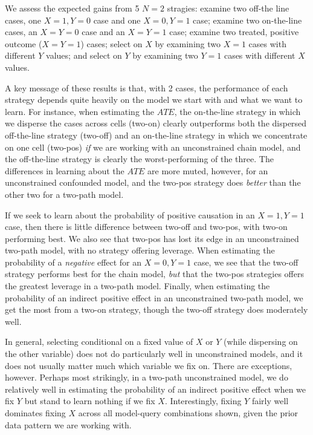 \documentclass[
  12pt,
]{book}
\begin{document}
We assess the expected gains from 5 \(N=2\) stragies: examine two off-the line cases, one \(X=1, Y=0\) case and one \(X=0, Y=1\) case; examine two on-the-line cases, an \(X=Y=0\) case and an \(X=Y=1\) case; examine two treated, positive outcome (\(X=Y=1\)) cases; select on \(X\) by examining two \(X=1\) cases with different \(Y\) values; and select on \(Y\) by examining two \(Y=1\) cases with different \(X\) values.

A key message of these results is that, with 2 cases, the performance of each strategy depends quite heavily on the model we start with and what we want to learn. For instance, when estimating the \(ATE\), the on-the-line strategy in which we disperse the cases across cells (two-on) clearly outperforms both the dispersed off-the-line strategy (two-off) and an on-the-line strategy in which we concentrate on one cell (two-pos) \emph{if} we are working with an unconstrained chain model, and the off-the-line strategy is clearly the worst-performing of the three. The differences in learning about the \(ATE\) are more muted, however, for an unconstrained confounded model, and the two-pos strategy does \emph{better} than the other two for a two-path model.

If we seek to learn about the probability of positive causation in an \(X=1, Y=1\) case, then there is little difference between two-off and two-pos, with two-on performing best. We also see that two-pos has lost its edge in an unconstrained two-path model, with no strategy offering leverage. When estimating the probability of a \emph{negative} effect for an \(X=0, Y=1\) case, we see that the two-off strategy performs best for the chain model, \emph{but} that the two-pos strategies offers the greatest leverage in a two-path model. Finally, when estimating the probability of an indirect positive effect in an unconstrained two-path model, we get the most from a two-on strategy, though the two-off strategy does moderately well.

In general, selecting conditional on a fixed value of \(X\) or \(Y\) (while dispersing on the other variable) does not do particularly well in unconstrained models, and it does not usually matter much which variable we fix on. There are exceptions, however. Perhaps most strikingly, in a two-path unconstrained model, we do relatively well in estimating the probability of an indirect positive effect when we fix \(Y\) but stand to learn nothing if we fix \(X\). Interestingly, fixing \(Y\) fairly well dominates fixing \(X\) across all model-query combinations shown, given the prior data pattern we are working with.
\end{document}
